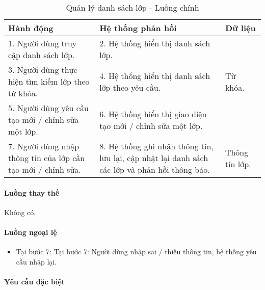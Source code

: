 \documentclass[./../main.tex]{subfiles}
\begin{document}
\begin{table}[H]
	\caption{Quản lý danh sách lớp - Luồng chính}
	\label{tab:admin_manage_classes}
	\begin{tabularx}{\textwidth}{|X|X|X|}
		\hline
		\textbf{Hành động}                                            & \textbf{Hệ thống phản hồi}                                                                     & \textbf{Dữ liệu} \\ \hline
		1. Người dùng truy cập danh sách lớp.                         & 2. Hệ thống hiển thị danh sách lớp.                                                            &                  \\ \hline
		3. Người dùng thực hiện tìm kiếm lớp theo từ khóa.            & 4. Hệ thống hiển thị danh sách lớp theo yêu cầu.                                               & Từ khóa.         \\ \hline
		5. Người dùng yêu cầu tạo mới / chỉnh sửa một lớp.            & 6. Hệ thống hiển thị giao diện tạo mới / chỉnh sửa một lớp.                                    &                  \\ \hline
		7. Người dùng nhập thông tin của lớp cần tạo mới / chỉnh sửa. & 8. Hệ thống ghi nhận thông tin, lưu lại, cập nhật lại danh sách các lớp và phản hồi thông báo. & Thông tin lớp.   \\ \hline
	\end{tabularx}
\end{table}

\paragraph*{Luồng thay thế} Không có.

\paragraph*{Luồng ngoại lệ}

\begin{itemize}
	\item

	      Tại bước 7: Tại bước 7: Người dùng nhập sai / thiếu thông tin, hệ thống yêu cầu nhập lại.

\end{itemize}

\paragraph*{Yêu cầu đặc biệt}
\end{document}
